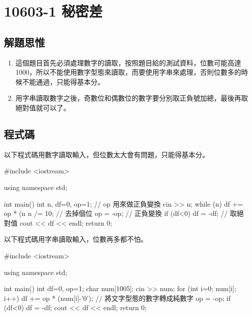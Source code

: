 \section{10603-1 秘密差}

\subsection{解題思惟}
\begin{enumerate}
	\item 這個題目首先必須處理數字的讀取，按照題目給的測試資料，位數可能高達1000，所以不能使用數字型態來讀取，而要使用字串來處理，否則位數多的時候不能通過，只能得基本分。\item 用字串讀取數字之後，奇數位和偶數位的數字要分別取正負號加總，最後再取絕對值就可以了。
\end{enumerate}

\subsection{程式碼}
以下程式碼用數字讀取輸入，但位數太大會有問題，只能得基本分。
\begin{cppcode}
#include <iostream>

using namespace std;

int main()
{
	int n, df=0, op=1; // op 用來做正負變換
	cin >> n;
	while (n) {
		df += op * (n%
		n /= 10; // 去掉個位
		op = -op; // 正負變換
	}
	if (df<0) df = -df; // 取絕對值
	cout << df << endl;
	return 0;
}
\end{cppcode}
以下程式碼用字串讀取輸入，位數再多都不怕。
\begin{cppcode}
#include <iostream>

using namespace std;

int main()
{
	int df=0, op=1;
	char num[1005];
	cin >> num;
	for (int i=0; num[i]; i++) {
		df += op * (num[i]-'0'); // 將文字型態的數字轉成純數字
		op = -op;
	}
	if (df<0) df = -df;
	cout << df << endl;
	return 0;
}
\end{cppcode}